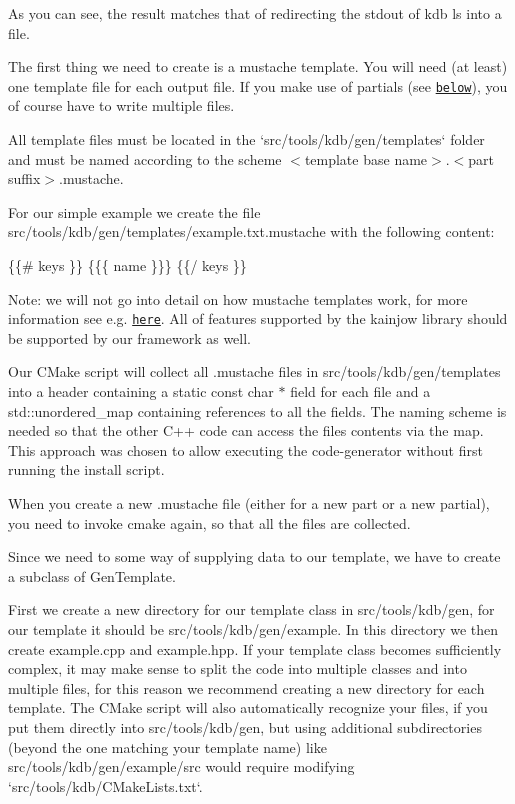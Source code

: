 As you can see, the result matches that of redirecting the stdout of {\ttfamily kdb ls} into a file.

The first thing we need to create is a mustache template. You will need (at least) one template file for each output file. If you make use of partials (see \href{#using-partials}{\tt below}), you of course have to write multiple files.

All template files must be located in the `src/tools/kdb/gen/templates` folder and must be named according to the scheme {\ttfamily $<$template base name$>$.$<$part suffix$>$.mustache}.

For our simple example we create the file {\ttfamily src/tools/kdb/gen/templates/example.\+txt.\+mustache} with the following content\+:


\begin{DoxyCode}
\{\{# keys \}\}
\{\{\{ name \}\}\}
\{\{/ keys \}\}
\end{DoxyCode}


Note\+: we will not go into detail on how mustache templates work, for more information see e.\+g. \href{https://mustache.github.io/mustache.5.html}{\tt here}. All of features supported by the kainjow library should be supported by our framework as well.

Our C\+Make script will collect all {\ttfamily .mustache} files in {\ttfamily src/tools/kdb/gen/templates} into a header containing a {\ttfamily static const char $\ast$} field for each file and a {\ttfamily std\+::unordered\+\_\+map} containing references to all the fields. The naming scheme is needed so that the other C++ code can access the files contents via the map. This approach was chosen to allow executing the code-\/generator without first running the install script.

When you create a new {\ttfamily .mustache} file (either for a new part or a new partial), you need to invoke {\ttfamily cmake} again, so that all the files are collected.

Since we need to some way of supplying data to our template, we have to create a subclass of {\ttfamily Gen\+Template}.

First we create a new directory for our template class in {\ttfamily src/tools/kdb/gen}, for our template it should be {\ttfamily src/tools/kdb/gen/example}. In this directory we then create {\ttfamily example.\+cpp} and {\ttfamily example.\+hpp}. If your template class becomes sufficiently complex, it may make sense to split the code into multiple classes and into multiple files, for this reason we recommend creating a new directory for each template. The C\+Make script will also automatically recognize your files, if you put them directly into {\ttfamily src/tools/kdb/gen}, but using additional subdirectories (beyond the one matching your template name) like {\ttfamily src/tools/kdb/gen/example/src} would require modifying `src/tools/kdb/\+C\+Make\+Lists.txt`.

